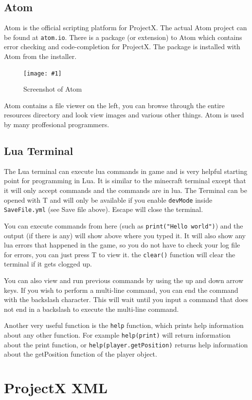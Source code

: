 \documentclass{book}
\newcommand{\fFigure}[2]
	{\begin{figure}[ht!]
		\centering
		\texttt{[image: \#1]}
		\caption{#2}
	\end{figure}}
\begin{document}
	\section{Atom}
	Atom is the official scripting platform for ProjectX. The actual Atom project can be found at \texttt{atom.io}. There is a package (or extension) to Atom which contains error checking and code-completion for ProjectX. The package is installed with Atom from the installer.
	
	\fFigure{Atom.png}{Screenshot of Atom}

	Atom contains a file viewer on the left, you can browse through the entire resources directory and look view images and various other things. Atom is used by many proffesional programmers.

	\section{Lua Terminal}
	The Lua terminal can execute lua commands in game and is very helpful starting point for programming in Lua. It is similar to the minecraft terminal except that it will only accept commands and the commands are in lua. The Terminal can be opened with T and will only be available if you enable \texttt{devMode} inside \texttt{SaveFile.yml} (see Save file above). Escape will close the terminal.

	You can execute commands from here (such as \texttt{print("Hello world")}) and the output (if there is any) will show above where you typed it. It will also show any lua errors that happened in the game, so you do not have to check your log file for errors, you can just press T to view it. the \texttt{clear()} function will clear the terminal if it gets clogged up.
	
	You can also view and run previous commands by using the up and down arrow keys. If you wish to perform a multi-line command, you can end the command with the backslash character. This will wait until you input a command that does not end in a backslash to execute the multi-line command.
	
	Another very useful function is the \texttt{help} function, which prints help information about any other function. For example \texttt{help(print)} will return information about the print function, or \texttt{help(player.getPosition)} returns help information about the getPosition function of the player object.

	\chapter{ProjectX XML}
\end{document}
